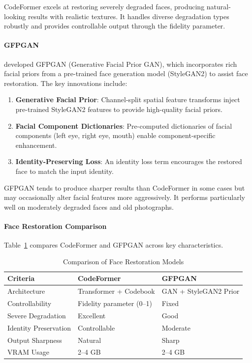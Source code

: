 \documentclass[12pt,a4paper]{report}
\begin{document}
CodeFormer excels at restoring severely degraded faces, producing natural-looking results with realistic textures. It handles diverse degradation types robustly and provides controllable output through the fidelity parameter.

\paragraph{GFPGAN}

\citet{wang2021gfpgan} developed GFPGAN (Generative Facial Prior GAN), which incorporates rich facial priors from a pre-trained face generation model (StyleGAN2) to assist face restoration. The key innovations include:

\begin{enumerate}
    \item \textbf{Generative Facial Prior}: Channel-split spatial feature transforms inject pre-trained StyleGAN2 features to provide high-quality facial priors.
    \item \textbf{Facial Component Dictionaries}: Pre-computed dictionaries of facial components (left eye, right eye, mouth) enable component-specific enhancement.
    \item \textbf{Identity-Preserving Loss}: An identity loss term encourages the restored face to match the input identity.
\end{enumerate}

GFPGAN tends to produce sharper results than CodeFormer in some cases but may occasionally alter facial features more aggressively. It performs particularly well on moderately degraded faces and old photographs.

\paragraph{Face Restoration Comparison}

Table~\ref{tab:face_restoration} compares CodeFormer and GFPGAN across key characteristics.

\begin{table}[H]
\centering
\caption{Comparison of Face Restoration Models}
\label{tab:face_restoration}
\renewcommand{\arraystretch}{1.3}
\begin{tabular}{|p{3.5cm}|p{5cm}|p{5cm}|}
\hline
\textbf{Criteria} & \textbf{CodeFormer} & \textbf{GFPGAN} \\
\hline
Architecture & Transformer + Codebook & GAN + StyleGAN2 Prior \\
\hline
Controllability & Fidelity parameter (0--1) & Fixed \\
\hline
Severe Degradation & Excellent & Good \\
\hline
Identity Preservation & Controllable & Moderate \\
\hline
Output Sharpness & Natural & Sharp \\
\hline
VRAM Usage & 2--4 GB & 2--4 GB \\
\hline
\end{tabular}
\end{table}
\end{document}
